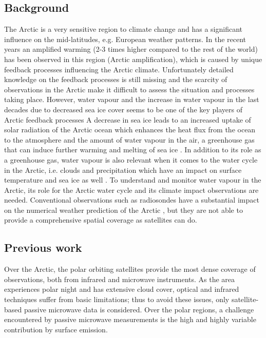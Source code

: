 \documentclass[12pt,oneside,a4paper]{article}
\begin{document}
\subsection{Background}
%
\label{sec:background}
The Arctic is a very sensitive region to climate change and has a significant influence on the mid-latitudes, e.g. European weather patterns. In the recent years an amplified warming (2-3 times higher compared to the rest of the world) has been observed in this region (Arctic amplification), which is caused by unique feedback processes influencing the Arctic climate. Unfortunately detailed knowledge on the feedback processes is still missing and the scarcity of observations in the Arctic make it difficult to assess the situation and processes taking place. However, water vapour and the increase in water vapour in the last decades due to decreased sea ice cover seems to be one of the key players of Arctic feedback processes \citep{serreze:2012:recen, vihma:2016:theat}  
A decrease in sea ice leads to an increased uptake of solar radiation of the Arctic ocean which enhances the heat flux from the ocean to the atmosphere and the amount of water vapour in the air, a greenhouse gas that can induce further warming and melting of sea ice \citep{screen:2010:thece}. 
In addition to its role as a greenhouse gas, water vapour is also relevant when it comes to the water cycle in the Arctic, i.e. clouds and precipitation which have an impact on surface temperature and sea ice as well \citep{blanchet:water:1995}. To understand and monitor water vapour in the Arctic, its role for the Arctic water cycle and its climate impact observations are needed.
Conventional observations such as radiosondes have a substantial impact on the numerical weather prediction of the Arctic \citep{lawrence:2019:usean}, but they are not able to provide a comprehensive spatial coverage as satellites can do.

\subsection{Previous work}
%
\label{sec:previousworks}
%
Over the Arctic, the polar orbiting satellites provide the most dense coverage of observations, both from infrared and microwave instruments. As the area experiences polar night and has extensive cloud cover, optical and infrared techniques suffer from basic limitations; thus to avoid these issues, only satellite-based passive microwave data is considered. Over the polar regions, a challenge encountered by passive microwave measurements is the high and highly variable contribution by surface emission.
\end{document}
